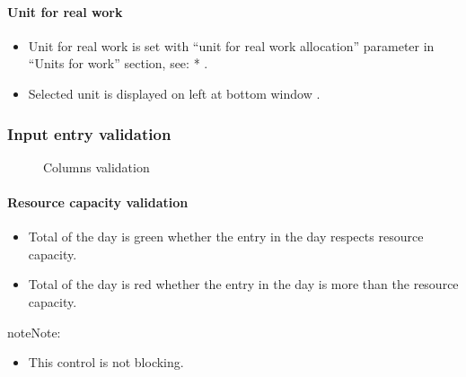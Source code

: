 \documentclass[letterpaper,10pt,english]{sphinxmanual}
\begin{document}
\paragraph{Unit for real work}
\begin{itemize}
\item {} 
Unit for real work is set with ``unit for real work allocation'' parameter in ``Units for work'' section, see: * {\hyperref[Administration:administration-global-parameters-label]{\emph{}}}.

\item {} 
Selected unit is displayed on left at bottom window .

\end{itemize}
\newpage

\subsubsection{Input entry validation}
\label{RealWorkAllocation:input-entry-validation}\begin{figure}[htbp]
\centering
\capstart

\caption{Columns validation}\end{figure}
\paragraph{Resource capacity validation}
\begin{itemize}
\item {} 
Total of the day is green whether the entry in the day respects resource capacity.

\item {} 
Total of the day is red whether the entry in the day is more than the resource capacity.

\end{itemize}

\begin{notice}{note}{Note:}\begin{itemize}
\item {} 
This control is not blocking.

\end{itemize}
\end{notice}
\end{document}
